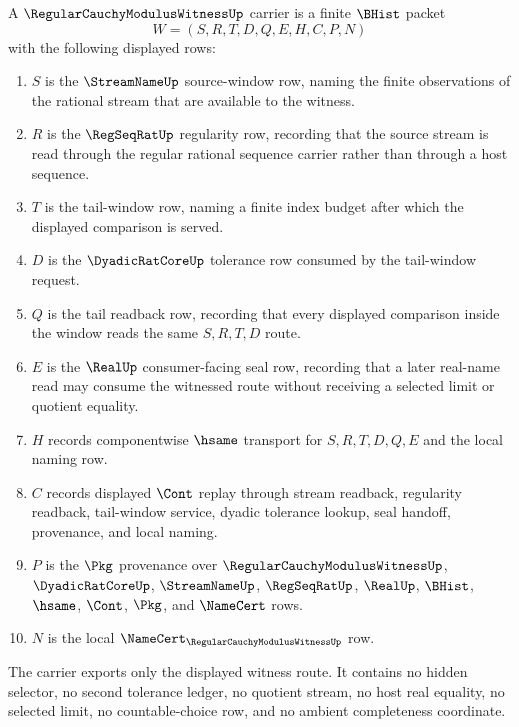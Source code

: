 \begin{definition}
\label{def:regular-cauchy-modulus-witness-carrier}
A $\RegularCauchyModulusWitnessUp$ carrier is a finite $\BHist$ packet
$$
W=(S,R,T,D,Q,E,H,C,P,N)
$$
with the following displayed rows:
\begin{enumerate}
\item $S$ is the $\StreamNameUp$ source-window row, naming the finite observations of the rational stream that are available to the witness.
\item $R$ is the $\RegSeqRatUp$ regularity row, recording that the source stream is read through the regular rational sequence carrier rather than through a host sequence.
\item $T$ is the tail-window row, naming a finite index budget after which the displayed comparison is served.
\item $D$ is the $\DyadicRatCoreUp$ tolerance row consumed by the tail-window request.
\item $Q$ is the tail readback row, recording that every displayed comparison inside the window reads the same $S,R,T,D$ route.
\item $E$ is the $\RealUp$ consumer-facing seal row, recording that a later real-name read may consume the witnessed route without receiving a selected limit or quotient equality.
\item $H$ records componentwise $\hsame$ transport for $S,R,T,D,Q,E$ and the local naming row.
\item $C$ records displayed $\Cont$ replay through stream readback, regularity readback, tail-window service, dyadic tolerance lookup, seal handoff, provenance, and local naming.
\item $P$ is the $\Pkg$ provenance over $\RegularCauchyModulusWitnessUp$, $\DyadicRatCoreUp$, $\StreamNameUp$, $\RegSeqRatUp$, $\RealUp$, $\BHist$, $\hsame$, $\Cont$, $\Pkg$, and $\NameCert$ rows.
\item $N$ is the local $\NameCert_{\RegularCauchyModulusWitnessUp}$ row.
\end{enumerate}
The carrier exports only the displayed witness route. It contains no hidden selector, no second tolerance ledger, no quotient stream, no host real equality, no selected limit, no countable-choice row, and no ambient completeness coordinate.
\end{definition}

